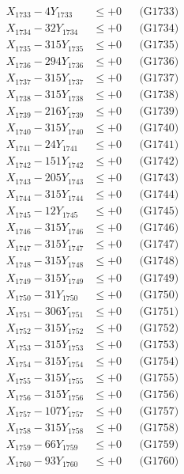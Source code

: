 \documentclass[a4paper,10pt]{article}
\begin{document}
{\begin{align}
X_{1733} - 4Y_{1733} &\leq +0 && \text{(G1733)} \\
X_{1734} - 32Y_{1734} &\leq +0 && \text{(G1734)} \\
X_{1735} - 315Y_{1735} &\leq +0 && \text{(G1735)} \\
X_{1736} - 294Y_{1736} &\leq +0 && \text{(G1736)} \\
X_{1737} - 315Y_{1737} &\leq +0 && \text{(G1737)} \\
X_{1738} - 315Y_{1738} &\leq +0 && \text{(G1738)} \\
X_{1739} - 216Y_{1739} &\leq +0 && \text{(G1739)} \\
X_{1740} - 315Y_{1740} &\leq +0 && \text{(G1740)} \\
\allowbreak
X_{1741} - 24Y_{1741} &\leq +0 && \text{(G1741)} \\
X_{1742} - 151Y_{1742} &\leq +0 && \text{(G1742)} \\
X_{1743} - 205Y_{1743} &\leq +0 && \text{(G1743)} \\
X_{1744} - 315Y_{1744} &\leq +0 && \text{(G1744)} \\
X_{1745} - 12Y_{1745} &\leq +0 && \text{(G1745)} \\
X_{1746} - 315Y_{1746} &\leq +0 && \text{(G1746)} \\
X_{1747} - 315Y_{1747} &\leq +0 && \text{(G1747)} \\
X_{1748} - 315Y_{1748} &\leq +0 && \text{(G1748)} \\
X_{1749} - 315Y_{1749} &\leq +0 && \text{(G1749)} \\
X_{1750} - 31Y_{1750} &\leq +0 && \text{(G1750)} \\
\allowbreak
X_{1751} - 306Y_{1751} &\leq +0 && \text{(G1751)} \\
X_{1752} - 315Y_{1752} &\leq +0 && \text{(G1752)} \\
X_{1753} - 315Y_{1753} &\leq +0 && \text{(G1753)} \\
X_{1754} - 315Y_{1754} &\leq +0 && \text{(G1754)} \\
X_{1755} - 315Y_{1755} &\leq +0 && \text{(G1755)} \\
X_{1756} - 315Y_{1756} &\leq +0 && \text{(G1756)} \\
X_{1757} - 107Y_{1757} &\leq +0 && \text{(G1757)} \\
X_{1758} - 315Y_{1758} &\leq +0 && \text{(G1758)} \\
X_{1759} - 66Y_{1759} &\leq +0 && \text{(G1759)} \\
X_{1760} - 93Y_{1760} &\leq +0 && \text{(G1760)} \\

\end{align}}
\end{document}
